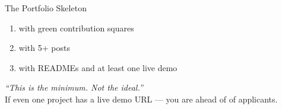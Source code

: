 \begin{frame}{The Portfolio Skeleton}
\begin{keybox}
  \begin{enumerate}
    \item {} with green contribution squares\\
          {\footnotesize{}}
    \item {} with 5+ posts\\
          {\footnotesize{}}
    \item {} with READMEs and at least one live demo\\
          {\footnotesize{}}
  \end{enumerate}
\end{keybox}
\vspace{1em}
\begin{center}
  {\normalsize\itshape ``This is the minimum. Not the ideal.''}\\[0.5em]
  {\small If even one project has a live demo URL — you are ahead of  of applicants.}
\end{center}
\end{frame}

